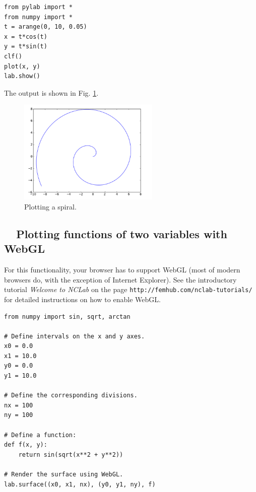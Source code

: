 \begin{verbatim}
from pylab import *
from numpy import *
t = arange(0, 10, 0.05)
x = t*cos(t)
y = t*sin(t)
clf()
plot(x, y)
lab.show()
\end{verbatim}
The output is shown in Fig. \ref{fig:plot6}.

\begin{figure}[!ht]
\begin{center}
\includegraphics[width=0.6\textwidth]{imgp/plot6.png}
\end{center}
\vspace{-6mm}
\caption{Plotting a spiral.}
\label{fig:plot6}
\vspace{-0mm}
\end{figure}
\noindent


\subsection{\ \ Plotting functions of two variables with WebGL}

For this functionality, your browser has to support WebGL (most of modern browsers do, 
with the exception of Internet Explorer). See the introductory tutorial {\em Welcome to NCLab}
on the page {\tt http://femhub.com/nclab-tutorials/} for detailed instructions on how to enable WebGL. 

\begin{verbatim}
from numpy import sin, sqrt, arctan

# Define intervals on the x and y axes.
x0 = 0.0
x1 = 10.0
y0 = 0.0
y1 = 10.0

# Define the corresponding divisions.
nx = 100
ny = 100

# Define a function:
def f(x, y):
    return sin(sqrt(x**2 + y**2))

# Render the surface using WebGL.
lab.surface((x0, x1, nx), (y0, y1, ny), f)
\end{verbatim}

